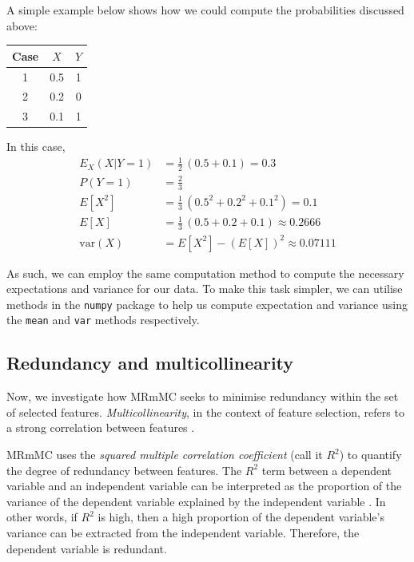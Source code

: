 \documentclass[12pt, twoside, a4paper]{report}
\def\var{\text{var}}
\begin{document}
A simple example below shows how we could compute the probabilities discussed above:

\begin{center}
    \begin{tabular}{| c || c | c |}
    \hline
     Case & $X$ & $Y$ \\ \hline \hline
     1 & 0.5 & 1 \\ \hline
     2 & 0.2 & 0 \\ \hline
     3 & 0.1 & 1 \\ \hline
    \end{tabular}
\end{center}

In this case,
\begin{align*}
E_X(X|Y=1) &= \frac{1}{2} \,  (0.5+0.1) = 0.3 \\
P(Y=1) &= \frac{2}{3} \\
E[X^2] &= \frac{1}{3} \, (0.5^2+0.2^2+0.1^2) = 0.1 \\
E[X] &= \frac{1}{3} \, (0.5+0.2+0.1) \approx 0.2666 \\
\var(X) &= E[X^2] - (E[X])^2 \approx 0.07111
\end{align*}

As such, we can employ the same computation method to compute the necessary expectations and variance for our data. To make this task simpler, we can utilise methods in the \texttt{numpy} \cite{RefWorks:214} package to help us compute expectation and variance using the \texttt{mean} and \texttt{var} methods respectively.

\subsection{Redundancy and multicollinearity}

Now, we investigate how MRmMC seeks to minimise redundancy within the set of selected features. \textit{Multicollinearity}, in the context of feature selection, refers to a strong correlation between features \cite{RefWorks:234}.

MRmMC uses the \textit{squared multiple correlation coefficient} (call it $R^2$) to quantify the degree of redundancy between features. The $R^2$ term between a dependent variable and an independent variable can be interpreted as the proportion of the variance of the dependent variable explained by the independent variable \cite{RefWorks:193}. In other words, if $R^2$ is high, then a high proportion of the dependent variable's variance can be extracted from the independent variable. Therefore, the dependent variable is redundant.
\end{document}
